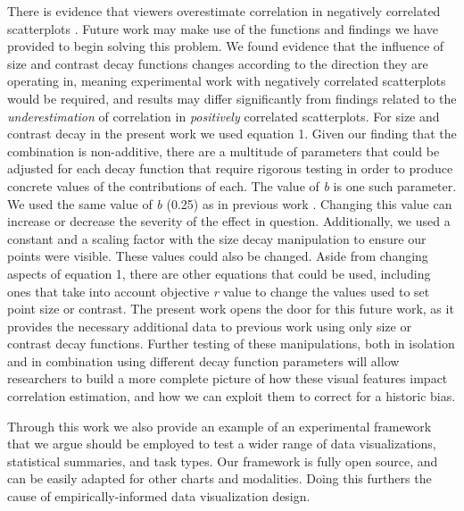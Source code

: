 \documentclass[manuscript, anonymous, screen]{acmart}
\begin{document}
There is evidence that viewers overestimate correlation in negatively
correlated scatterplots \citep{sher_2017}. Future work may make use of
the functions and findings we have provided to begin solving this
problem. We found evidence that the influence of size and contrast decay
functions changes according to the direction they are operating in,
meaning experimental work with negatively correlated scatterplots would
be required, and results may differ significantly from findings related
to the \emph{underestimation} of correlation in \emph{positively}
correlated scatterplots. For size and contrast decay in the present work
we used equation 1. Given our finding that the combination is
non-additive, there are a multitude of parameters that could be adjusted
for each decay function that require rigorous testing in order to
produce concrete values of the contributions of each. The value of
\emph{b} is one such parameter. We used the same value of \emph{b}
(0.25) as in previous work \citep{strain_2023, strain_2023b}. Changing
this value can increase or decrease the severity of the effect in
question. Additionally, we used a constant and a scaling factor with the
size decay manipulation to ensure our points were visible. These values
could also be changed. Aside from changing aspects of equation 1, there
are other equations that could be used, including ones that take into
account objective \emph{r} value to change the values used to set point
size or contrast. The present work opens the door for this future work,
as it provides the necessary additional data to previous work using only
size \citep{strain_2023b} or contrast \citep{strain_2023} decay
functions. Further testing of these manipulations, both in isolation and
in combination using different decay function parameters will allow
researchers to build a more complete picture of how these visual
features impact correlation estimation, and how we can exploit them to
correct for a historic bias.

Through this work we also provide an example of an experimental
framework that we argue should be employed to test a wider range of data
visualizations, statistical summaries, and task types. Our framework is
fully open source, and can be easily adapted for other charts and
modalities. Doing this furthers the cause of empirically-informed data
visualization design.




\end{document}
